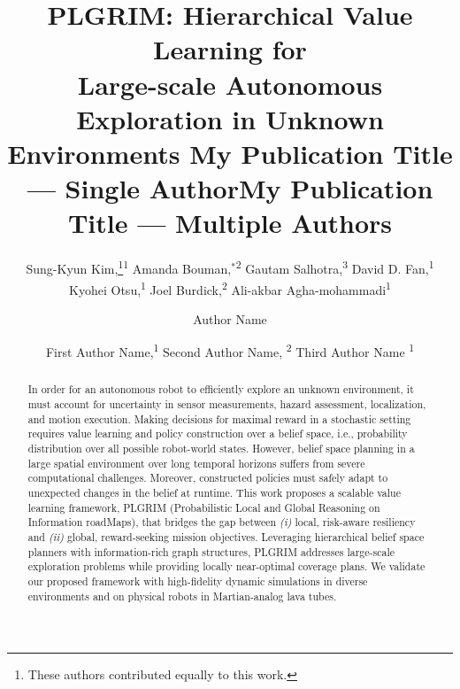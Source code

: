 \documentclass[letterpaper]{article} %
\title{
    PLGRIM: Hierarchical Value Learning for \\Large-scale Autonomous Exploration in Unknown Environments
}
\author{
		Sung-Kyun Kim,\thanks{These authors contributed equally to this work.}\textsuperscript{\rm 1}
    Amanda Bouman,$^{*}$\textsuperscript{\rm 2}
    Gautam Salhotra,\textsuperscript{\rm 3}
    David D. Fan,\textsuperscript{\rm 1} \\
    Kyohei Otsu,\textsuperscript{\rm 1}
    Joel Burdick,\textsuperscript{\rm 2}
    Ali-akbar Agha-mohammadi\textsuperscript{\rm 1} \\
}
\title{My Publication Title --- Single Author}
\author {
    Author Name \\
}
\title{My Publication Title --- Multiple Authors}
\author {
    First Author Name,\textsuperscript{\rm 1}
    Second Author Name, \textsuperscript{\rm 2}
    Third Author Name \textsuperscript{\rm 1} \\
}
\newcommand{\acomm}[1]{{\color{cyan}Ali:#1}} %
\begin{document}
\maketitle

\begin{abstract}
In order for an autonomous robot to efficiently explore an unknown environment, it must account for uncertainty in sensor measurements, hazard assessment, localization, and motion execution.
Making decisions for maximal reward in a stochastic setting requires value learning and policy construction over a belief space, i.e., probability distribution over all possible robot-world states.
However, belief space planning in a large spatial environment over long temporal horizons suffers from severe computational challenges.
Moreover, constructed policies must safely adapt to unexpected changes in the belief at runtime.
This work proposes a scalable value learning framework, PLGRIM (Probabilistic Local and Global Reasoning on Information roadMaps), that bridges the gap between \textit{(i)} local, risk-aware resiliency and \textit{(ii)} global, reward-seeking mission objectives.  
Leveraging hierarchical belief space planners with information-rich graph structures, PLGRIM addresses large-scale exploration problems 
while providing locally near-optimal coverage plans. 
We validate our proposed framework with high-fidelity dynamic simulations in diverse environments and on physical robots
in Martian-analog lava tubes.
\end{abstract}


\end{document}
